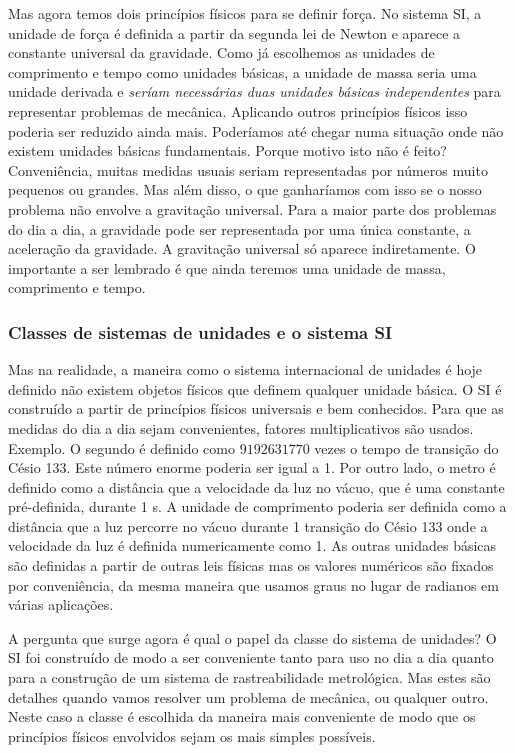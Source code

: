 Mas agora temos dois princípios físicos para se definir força. No sistema SI, a unidade de força é definida a partir da segunda lei de Newton e aparece a constante universal da gravidade. Como já escolhemos as unidades de comprimento e tempo como unidades básicas, a unidade de massa seria uma unidade derivada e \emph{seríam necessárias duas unidades básicas independentes} para representar problemas de mecânica. Aplicando outros princípios físicos isso poderia ser reduzido ainda mais. Poderíamos até chegar numa situação onde não existem unidades básicas fundamentais. Porque motivo isto não é feito? Conveniência, muitas medidas usuais seriam representadas por números muito pequenos ou grandes. Mas além disso, o que ganharíamos com isso se o nosso problema não envolve a gravitação universal. Para a maior parte dos problemas do dia a dia, a gravidade pode ser representada por uma única constante, a aceleração da gravidade. A gravitação universal só aparece indiretamente. O importante a ser lembrado é que ainda teremos uma unidade de massa, comprimento e tempo. 

\subsubsection{Classes de sistemas de unidades e o sistema SI}

Mas na realidade, a maneira como o sistema internacional de unidades é hoje definido não existem objetos físicos que definem qualquer unidade básica. O SI é construído a partir de princípios físicos universais e bem conhecidos. Para que as medidas do dia a dia sejam convenientes, fatores multiplicativos são usados. Exemplo. O segundo é definido como $9 192 631 770$ vezes o tempo de transição do Césio 133. Este número enorme poderia ser igual a 1. Por outro lado, o metro é definido como a distância que a velocidade da luz no vácuo, que é uma constante pré-definida, durante 1 s. A unidade de comprimento poderia ser definida como a distância que a luz percorre no vácuo durante 1 transição do Césio 133 onde a velocidade da luz é definida numericamente como 1. As outras unidades básicas são definidas a partir de outras leis físicas mas os valores numéricos são fixados por conveniência, da mesma maneira que usamos graus no lugar de radianos em várias aplicações.

A pergunta que surge agora é qual o papel da classe do sistema de unidades? O SI  foi construído de modo a ser conveniente tanto para uso no dia a dia quanto para a construção de um sistema de rastreabilidade metrológica. Mas estes são detalhes quando vamos resolver um problema de mecânica, ou qualquer outro. Neste caso a classe é escolhida da maneira mais conveniente de modo que os princípios físicos envolvidos sejam os mais simples possíveis. 







